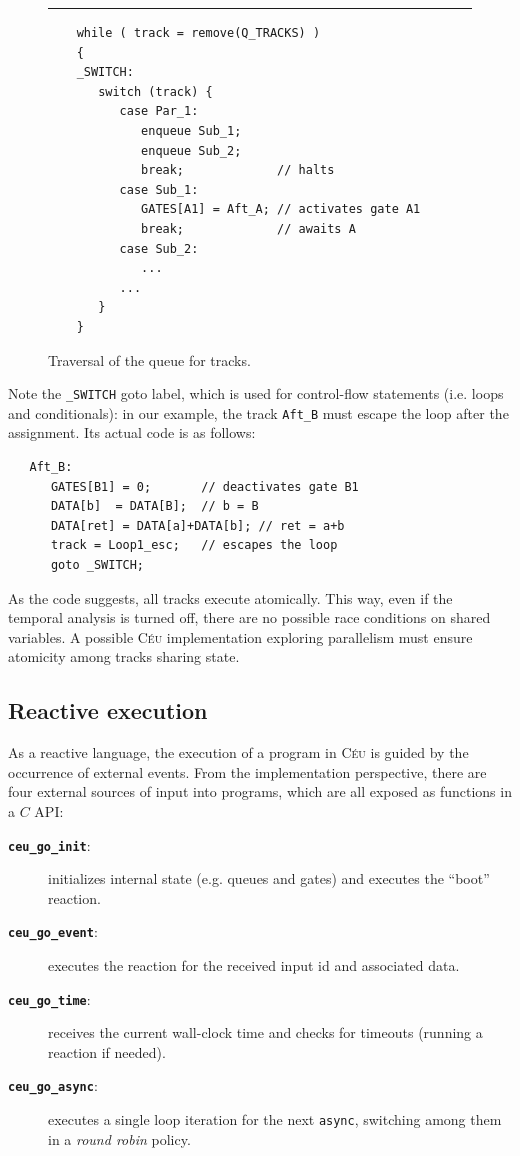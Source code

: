 \documentclass{sigplan-proc}
\newcommand{\2}{\;\;}
\newcommand{\5}{\;\;\;\;\;}
\newcommand{\CEU}{\textsc{C\'{e}u}}
\newcommand{\code}[1] {{\small{\texttt{#1}}}}
\begin{document}
\begin{figure}[t]
\rule{8.5cm}{0.37pt}
{\small
\begin{verbatim}
    while ( track = remove(Q_TRACKS) )
    {
    _SWITCH:
       switch (track) {
          case Par_1:
             enqueue Sub_1;
             enqueue Sub_2;
             break;             // halts
          case Sub_1:
             GATES[A1] = Aft_A; // activates gate A1
             break;             // awaits A
          case Sub_2:
             ...
          ...
       }
    }
\end{verbatim}
}
\caption{ Traversal of the queue for tracks.
\label{lst:impl:code:2}
}
\end{figure}

Note the \code{\_SWITCH} goto label, which is used for control-flow statements 
(i.e. loops and conditionals): in our example, the track \code{Aft\_B} must escape 
the loop after the assignment.
Its actual code is as follows:
{\small
\begin{verbatim}
   Aft_B:
      GATES[B1] = 0;       // deactivates gate B1
      DATA[b]  = DATA[B];  // b = B
      DATA[ret] = DATA[a]+DATA[b]; // ret = a+b
      track = Loop1_esc;   // escapes the loop
      goto _SWITCH;
\end{verbatim}
}

As the code suggests, all tracks execute atomically.
This way, even if the temporal analysis is turned off, there are no possible 
race conditions on shared variables.
A possible \CEU{} implementation exploring parallelism must ensure atomicity 
among tracks sharing state.

\subsection{Reactive execution}

As a reactive language, the execution of a program in \CEU{} is guided by the 
occurrence of external events.
From the implementation perspective, there are four external sources of input 
into programs, which are all exposed as functions in a $C$ API:

\begin{description}
\item[{\textbf\code{ceu\_go\_init}}:] initializes internal state (e.g. queues 
and gates) and executes the ``boot'' reaction.

\item[{\textbf\code{ceu\_go\_event}}:] executes the reaction for the received 
input id and associated data.

\item[{\textbf\code{ceu\_go\_time}}:] receives the current wall-clock time and 
checks for timeouts (running a reaction if needed).

\item[{\textbf\code{ceu\_go\_async}}:] executes a single loop iteration for the
next \code{async}, switching among them in a \emph{round robin} policy.
\end{description}
\end{document}
